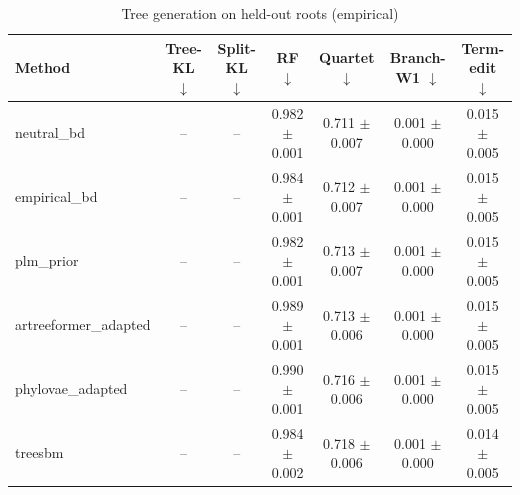 \begin{table}[t]\centering
\caption{Tree generation on held-out roots (empirical)}
\begin{tabular}{lcccccc}
\toprule
Method & Tree-KL $\downarrow$ & Split-KL $\downarrow$ & RF $\downarrow$ & Quartet $\downarrow$ & Branch-W1 $\downarrow$ & Term-edit $\downarrow$ \\
\midrule
neutral\_bd & -- & -- & 0.982 $\pm$ 0.001 & 0.711 $\pm$ 0.007 & 0.001 $\pm$ 0.000 & 0.015 $\pm$ 0.005 \\
empirical\_bd & -- & -- & 0.984 $\pm$ 0.001 & 0.712 $\pm$ 0.007 & 0.001 $\pm$ 0.000 & 0.015 $\pm$ 0.005 \\
plm\_prior & -- & -- & 0.982 $\pm$ 0.001 & 0.713 $\pm$ 0.007 & 0.001 $\pm$ 0.000 & 0.015 $\pm$ 0.005 \\
artreeformer\_adapted & -- & -- & 0.989 $\pm$ 0.001 & 0.713 $\pm$ 0.006 & 0.001 $\pm$ 0.000 & 0.015 $\pm$ 0.005 \\
phylovae\_adapted & -- & -- & 0.990 $\pm$ 0.001 & 0.716 $\pm$ 0.006 & 0.001 $\pm$ 0.000 & 0.015 $\pm$ 0.005 \\
treesbm & -- & -- & 0.984 $\pm$ 0.002 & 0.718 $\pm$ 0.006 & 0.001 $\pm$ 0.000 & 0.014 $\pm$ 0.005 \\
\bottomrule
\end{tabular}
\end{table}